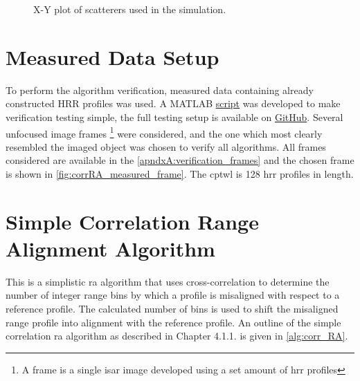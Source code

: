 \documentclass[class=report,11pt,crop=false]{standalone}
\begin{document}
    \begin{figure}[ht]
        \centering
        \captionsetup{type=figure}
        \begin{minipage}{0.5\linewidth} %
            \centering
            \resizebox{\linewidth}{!}{}
            \caption{X-Y plot of scatterers used in the simulation.\label{fig:sim_scatterers}}
        \end{minipage}
    \end{figure}


\section{Measured Data Setup}
To perform the algorithm verification, measured data containing already constructed \gls{HRR} profiles was used. A \textsc{MATLAB} \href{}{script} was developed to make verification testing simple, the full testing setup is available on \href{}{GitHub}. Several unfocused image frames \footnote{A frame is a single \gls{isar} image developed using a set amount of \gls{hrr} profiles} were considered, and the one which most clearly resembled the imaged object was chosen to verify all algorithms. All frames considered are available in the \autoref{apndxA:verification_frames} and the chosen frame is shown in \autoref{fig:corrRA_measured_frame}. The \gls{cptwl} is 128 \gls{hrr} profiles in length.
\section{Simple Correlation Range Alignment Algorithm}
This is a simplistic \gls{ra} algorithm that uses cross-correlation to determine the number of integer range bins by which a profile is misaligned with respect to a reference profile.
The calculated number of bins is used to shift the misaligned range profile into alignment with the reference profile. An outline of the simple correlation \gls{ra} algorithm as described in Chapter 4.1.1. \cite{ISARtextbook_Martorella} is given in \autoref{alg:corr_RA}.
\end{document}
